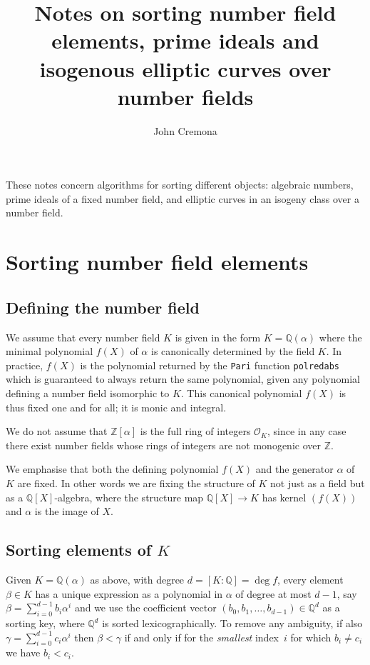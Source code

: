 \documentclass{article}
\title{Notes on sorting number field elements, prime ideals and
  isogenous elliptic curves over number fields} \author{John Cremona}
\def\Z{{\mathbb Z}}
\def\Q{{\mathbb Q}}
\def\OO{{\mathcal O}}
\begin{document}
\maketitle

These notes concern algorithms for sorting different objects:
algebraic numbers, prime ideals of a fixed number field, and elliptic
curves in an isogeny class over a number field.

\section{Sorting number field elements}
\subsection{Defining the number field}
We assume that every number field $K$ is given in the form
$K=\Q(\alpha)$ where the minimal polynomial $f(X)$ of $\alpha$ is
canonically determined by the field $K$.  In practice, $f(X)$ is the
polynomial returned by the {\tt Pari} function {\tt polredabs} which
is guaranteed to always return the same polynomial, given any
polynomial defining a number field isomorphic to $K$.  This canonical
polynomial $f(X)$ is thus fixed one and for all; it is monic and
integral.

We do not assume that $\Z[\alpha]$ is the full ring of integers
$\OO_K$, since in any case there exist number fields whose rings of
integers are not monogenic over $\Z$.

We emphasise that both the defining polynomial $f(X)$ and the generator
$\alpha$ of~$K$ are fixed.  In other words we are fixing the structure
of $K$ not just as a field but as a $\Q[X]$-algebra, where the
structure map $\Q[X]\to K$ has kernel $(f(X))$ and $\alpha$ is the
image of $X$.

\subsection{Sorting elements of $K$}
Given $K=\Q(\alpha)$ as above, with degree $d=[K:\Q]=\deg f$, every
element $\beta\in K$ has a unique expression as a polynomial in
$\alpha$ of degree at most $d-1$, say
$\beta=\sum_{i=0}^{d-1}b_i\alpha^i$ and we use the coefficient vector
$(b_0,b_1,\dots,b_{d-1})\in\Q^d$ as a sorting key, where $\Q^d$ is
sorted lexicographically.  To remove any ambiguity, if also
$\gamma=\sum_{i=0}^{d-1}c_i\alpha^i$ then $\beta<\gamma$ if and only
if for the \textit{smallest} index~$i$ for which $b_i\not=c_i$ we have
$b_i<c_i$.
\end{document}
